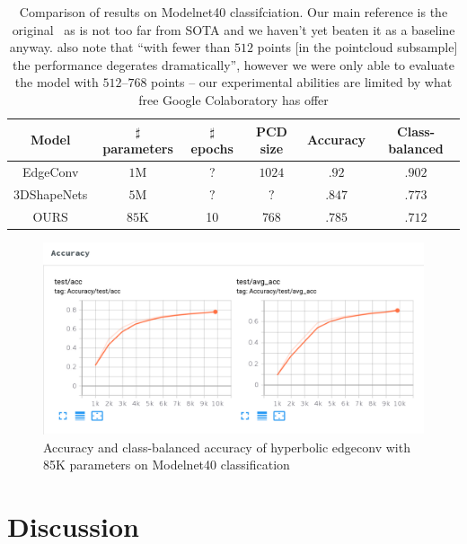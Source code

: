 \begin{table}[h!]
\centering
\begin{tabular}{|c c c c c c|} 
 \hline
 Model & \(\sharp\) parameters & \( \sharp \) epochs & PCD size & Accuracy & Class-balanced
 \\ [0.5ex] 
 \hline\hline
 EdgeConv & \( 1 \)M & ?  & \(1024\) & \(.92\) & \(.902\)  \\ 
 3DShapeNets & \( 5 \)M & \( ? \)  & \( ? \) & \(.847\) & \(.773\)  \\ 
 OURS & \( 85 \)K & 10 & 768 & \(.785\)  & \( .712 \) \\ [1ex] 
 \hline
\end{tabular}
\caption{Comparison of results on Modelnet40 classifciation.  Our main
reference is the original~\citet{edgeconv} as is not too far from SOTA and we
haven't yet beaten it as a baseline anyway. \citet{edgeconv} also note
that ``with fewer than \( 512 \) points [in the pointcloud subsample]
the performance degerates dramatically'', however we were only able
to evaluate the model with \( 512 \)--\( 768 \) points -- our
experimental abilities are limited by what free Google Colaboratory has
offer}
\label{fig:edgeconvComparison}
\end{table}

\begin{figure}[h]\center
\includegraphics[width=.9\textwidth]{art/hedgeconv-tensorboard.pdf}
\caption{Accuracy and class-balanced accuracy of hyperbolic edgeconv with 85K
parameters on Modelnet40 classification}
\label{fig:hedgeconvAccCurve}
\end{figure}

\section{Discussion} \label{sec:discussion}


